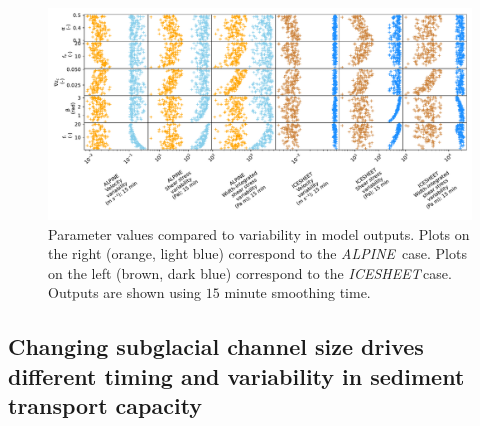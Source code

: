 \documentclass[esurf, manuscript]{copernicus}
\newcommand{\alpine}{\textit{ALPINE}\,}
\newcommand{\icesheet}{\textit{ICESHEET}\,}
\begin{document}
\begin{figure}[hbt!]
  \centering
  \includegraphics[width=0.9\linewidth]{Fig4.pdf}
  \caption{Parameter values compared to variability in model outputs.
    Plots on the right (orange, light blue) correspond to the \alpine{} case. Plots on the left (brown, dark blue) correspond to the \icesheet case.
    Outputs are shown using $15$ minute smoothing time. 
  }
  \label{fig:params}
\end{figure}

\FloatBarrier
\subsection{Changing subglacial channel size drives different timing and variability in sediment transport capacity}
\end{document}
